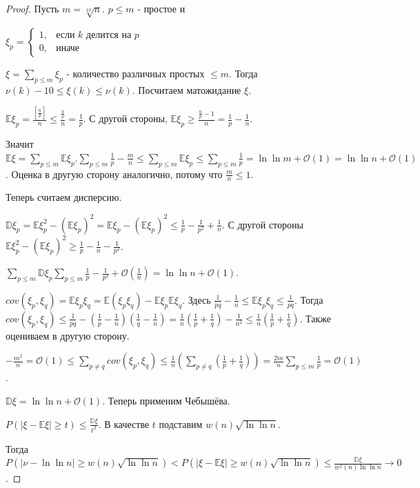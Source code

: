 \begin{proof}
    Пусть $m = \sqrt[10]{n}$. $p \leqslant m$ - простое и

    $
    \xi_p =
    \begin{cases}
        1, & \text{если $k$ делится на $p$} \\
        0, & \text{иначе}
    \end{cases}
    $

    $\xi = \sum_{p \leqslant m} \xi_p$ - количество различных простых $\leqslant m$. Тогда
    $\nu(k) - 10 \leqslant \xi (k) \leqslant \nu (k)$. Посчитаем матожидание $\xi$.

    $\mathbb{E} \xi_p = \frac{[\frac{n}{p}]}{n} \leqslant \frac{\frac{n}{p}}{n} = \frac{1}{p}$. С другой стороны,
    $\mathbb{E} \xi_p \geqslant \frac{\frac{n}{p} - 1}{n} = \frac{1}{p} - \frac{1}{n}$.

    Значит $\mathbb{E}\xi = \sum_{p \leqslant m} \mathbb{E}\xi_p. \sum_{p \leqslant m} \frac{1}{p} - \frac{m}{n} \leqslant
    \sum_{p \leqslant m} \mathbb{E}\xi_p \leqslant \sum_{p \leqslant m} \frac{1}{p} = \ln \ln m + \mathcal{O}(1) =
    \ln \ln n + \mathcal{O}(1)$. Оценка в другую сторону аналогично, потому что $\frac{m}{n} \leqslant 1$.

    Теперь считаем дисперсию.

    $\mathbb{D}\xi_p = \mathbb{E}\xi_p^2 - (\mathbb{E}\xi_p)^2 = \mathbb{E}\xi_p - (\mathbb{E}\xi_p)^2 \leqslant \frac{1}{p} - \frac{1}{p^2} + \frac{1}{n}$.
    С другой стороны $\mathbb{E}\xi_p^2 - (\mathbb{E}\xi_p)^2 \geqslant \frac{1}{p} - \frac{1}{n} - \frac{1}{p^2}$.

    $\sum_{p \leqslant m} \mathbb{D} \xi_p \sum_{p \leqslant m} \frac{1}{p} - \frac{1}{p^2} + \mathcal{O}(\frac{1}{n}) = \ln \ln n + \mathcal{O}(1)$.

    $cov(\xi_p, \xi_q) = \mathbb{E}\xi_p \xi_q = \mathbb{E} (\xi_p \xi_q) - \mathbb{E} \xi_p \mathbb{E}\xi_q$. Здесь
    $\frac{1}{pq} - \frac{1}{n} \leqslant \mathbb{E} \xi_p \xi_q \leqslant \frac{1}{pq}$. Тогда $cov(\xi_p, \xi_q) \leqslant
    \frac{1}{pq} - (\frac{1}{p} - \frac{1}{n})(\frac{1}{q} - \frac{1}{n}) = \frac{1}{n}(\frac{1}{p} + \frac{1}{q}) - \frac{1}{n^2} \leqslant \frac{1}{n}(\frac{1}{p} + \frac{1}{q})$.
    Также оцениваем в другую сторону.

    $-\frac{m^2}{n} = \mathcal{O}(1) \leqslant \sum_{p \neq q} cov (\xi_p, \xi_q) \leqslant \frac{1}{n}(\sum_{p \neq q} (\frac{1}{p} + \frac{1}{q})) =
    \frac{2m}{n} \sum_{p \leqslant m} \frac{1}{p} = \mathcal{O}(1)$.

    $\mathbb{D}\xi = \ln \ln n + \mathcal{O}(1)$. Теперь применим Чебышёва.

    $P(|\xi - \mathbb{E} \xi| \geqslant t) \leqslant \frac{\mathbb{D}\xi}{t^2}$. В качестве $t$ подставим $w(n) \sqrt{\ln \ln n}$.

    Тогда $P (|\nu - \ln \ln n| \geqslant w(n) \sqrt{\ln \ln n}) < P(|\xi - \mathbb{E} \xi| \geqslant w(n) \sqrt{\ln \ln n}) \leqslant \frac{\mathbb{D}\xi}{w^2(n) \ln \ln n} \to 0$.

\end{proof}

